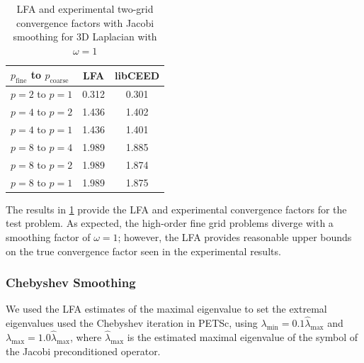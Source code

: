 \documentclass[review]{siamart190516}
\begin{document}
\begin{table}[ht!]
\begin{center}
\begin{tabular}{l c c}
  \toprule
  $p_{\text{fine}}$ to $p_{\text{coarse}}$  &  LFA  &  libCEED  \\
  \toprule
  $p = 2$ to $p = 1$   &  0.312  &  0.301  \\
  \midrule
  $p = 4$ to $p = 2$   &  1.436  &  1.402  \\
  $p = 4$ to $p = 1$   &  1.436  &  1.401  \\
  \midrule
  $p = 8$ to $p = 4$   &  1.989  &  1.885  \\
  $p = 8$ to $p = 2$   &  1.989  &  1.874  \\
  $p = 8$ to $p = 1$   &  1.989  &  1.875  \\
  \bottomrule
\end{tabular}
\end{center}
\caption{LFA and experimental two-grid convergence factors with Jacobi smoothing for 3D Laplacian with $\omega = 1$}
\label{table:two_grid_3d_jacobi}
\end{table}

The results in \cref{table:two_grid_3d_jacobi} provide the LFA and experimental convergence factors for the test problem.
As expected, the high-order fine grid problems diverge with a smoothing factor of $\omega = 1$; however, the LFA provides reasonable upper bounds on the true convergence factor seen in the experimental results.

\subsubsection{Chebyshev Smoothing}

We used the LFA estimates of the maximal eigenvalue to set the extremal eigenvalues used the Chebyshev iteration in PETSc, using $\lambda_{\text{min}} = 0.1 \hat{\lambda}_{\text{max}}$ and $\lambda_{\text{max}} = 1.0 \hat{\lambda}_{\text{max}}$, where $\hat{\lambda}_{\text{max}}$ is the estimated maximal eigenvalue of the symbol of the Jacobi preconditioned operator.
\end{document}
